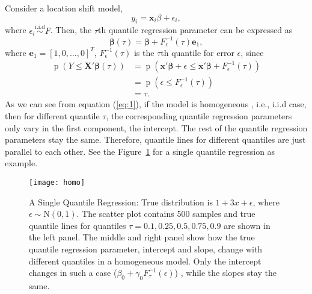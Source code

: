 \documentclass[12pt]{article}
\DeclareMathOperator{\pr}{p}
\begin{document}
Consider a location shift model, 
\begin{displaymath}
  y_i = \bm{x}_i\beta + \epsilon_i, 
\end{displaymath}
where $\epsilon_i \stackrel{\text{i.i.d}}{\sim} F$. Then, the $\tau$th
quantile regression parameter can be expressed as 
\begin{equation}
  \label{eq:1}
  \bm{\beta}(\tau) = \bm{\beta} + F^{-1}_{\epsilon}(\tau) \bm{e}_1,
\end{equation}
where $\bm{e}_1 = [1, 0, \ldots, 0]^T$, $F^{-1}_{\epsilon}(\tau)$ is
the $\tau$th quantile for error $\epsilon$, since 
\begin{align*}
  \pr (Y \le \bm{X'\beta}(\tau)) & = \pr \left( \bm{x'\beta} + \epsilon
    \le \bm{x'\beta} + F^{-1}_{\epsilon}(\tau) \right) \\
  & = \pr (\epsilon \le F^{-1}_{\epsilon}(\tau)) \\
  & = \tau. 
\end{align*}
As we can see from equation (\ref{eq:1}), if the model is homogeneous
, i.e., i.i.d case, then for different quantile $\tau$, the
corresponding quantile regression parameters only vary in the
first component, the intercept. The rest of the quantile regression
parameters stay the same. Therefore, quantile lines for different
quantiles are just parallel to each other. See the
Figure~\ref{fig:homo} for a single quantile regression as example. 

\begin{figure}[h]
  \centerline{\texttt{[image: homo]}}
  \caption[]{\label{fig:homo} A Single Quantile Regression: True 
    distribution is $1+3x + \epsilon$, where $\epsilon \sim
    \mathrm{N}(0,1)$. The scatter plot contains 500 samples and true quantile
    lines for quantiles $\tau=0.1,0.25,0.5,0.75,0.9$ are shown in the
    left panel. The middle and right panel show how the true quantile
    regression parameter, intercept and slope, change with different
    quantiles in a homogeneous model. Only the intercept changes in such
    a case ($\beta_0+\gamma_0 F^{-1}_{\tau}(\epsilon)$) , while the slopes
    stay the same.}
  \label{fig:homo}
\end{figure}
\end{document}
